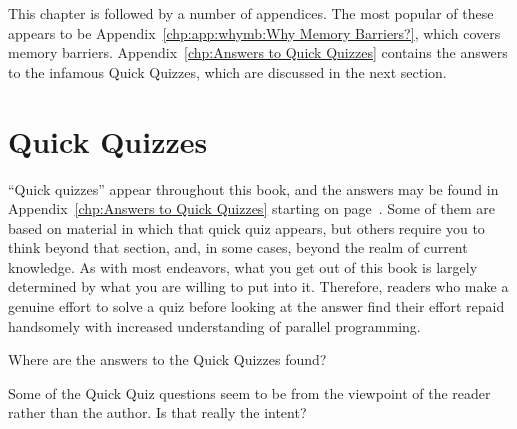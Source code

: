 This chapter is followed by a number of appendices.
The most popular of these appears to be
Appendix~\ref{chp:app:whymb:Why Memory Barriers?},
which covers memory barriers.
Appendix~\ref{chp:Answers to Quick Quizzes}
contains the answers to the infamous Quick Quizzes, which are discussed in
the next section.

\section{Quick Quizzes}
\label{sec:howto:Quick Quizzes}

``Quick quizzes'' appear throughout this book, and the answers may
be found in
Appendix~\ref{chp:Answers to Quick Quizzes} starting on
page~\pageref{chp:Answers to Quick Quizzes}.
Some of them are based on material in which that quick quiz
appears, but others require you to think beyond that section, and,
in some cases, beyond the realm of current knowledge.
As with most endeavors, what you get out of this book is largely
determined by what you are willing to put into it.
Therefore, readers who make a genuine effort to solve a quiz before
looking at the answer
find their effort repaid handsomely with increased understanding
of parallel programming.

\QuickQuiz{}
	Where are the answers to the Quick Quizzes found?
 \QuickQuizEnd

\QuickQuiz{}
	Some of the Quick Quiz questions seem to be from the viewpoint
	of the reader rather than the author.
	Is that really the intent?
 \QuickQuizEnd

